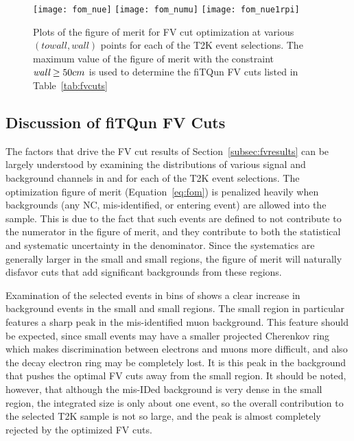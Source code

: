 \begin{figure}[h]
  \begin{center}
    \texttt{[image: fom\_nue]}
    \texttt{[image: fom\_numu]}
    \texttt{[image: fom\_nue1rpi]}
  \end{center}
  \caption{Plots of the figure of merit for FV cut optimization at various
  $(towall,wall)$ points for each of the T2K event selections. The maximum value of the figure of merit with the
  constraint $\emph{wall} \geq 50 cm$ is used to determine the fiTQun FV cuts listed in
  Table~\ref{tab:fvcuts}}
  \label{fig:fom}
\end{figure}



\subsection{Discussion of fiTQun FV Cuts}
\label{subsec:fvdiscuss}

The factors that drive the FV cut results of Section~\ref{subsec:fvresults} can
be largely understood by examining the distributions of various signal
and background channels in \wall and \towall for each of the T2K event
selections.  The optimization figure of merit (Equation~\ref{eq:fom}) is
penalized heavily when backgrounds (any NC, mis-identified, or entering event)
are allowed into the sample.  This is due to the fact that such events are
defined to not contribute to the numerator in the figure of merit, and they
contribute to both the statistical and systematic uncertainty in the
denominator. Since the systematics are generally larger in the
small \wall and small \towall regions, the figure of merit will naturally
disfavor cuts that add significant backgrounds from these regions.  


Examination of the selected \nue events in bins of \towall shows a clear
increase in background events in the small \towall and small \wall regions.
The small \towall region in particular features a sharp peak in the
mis-identified muon background.  This feature should be expected, since small
\towall events may have a smaller projected Cherenkov ring which makes
discrimination between electrons and muons more difficult, and also the decay
electron ring may be completely lost. It is this peak in the background that pushes
the optimal FV cuts away from the small \towall region.  It should be noted,
however, that although the mis-IDed background is very dense in the small
\towall region, the integrated size is only about one event, so the overall
contribution to the selected \nue T2K sample is not so large, and the peak
is almost completely rejected by the optimized FV cuts.

